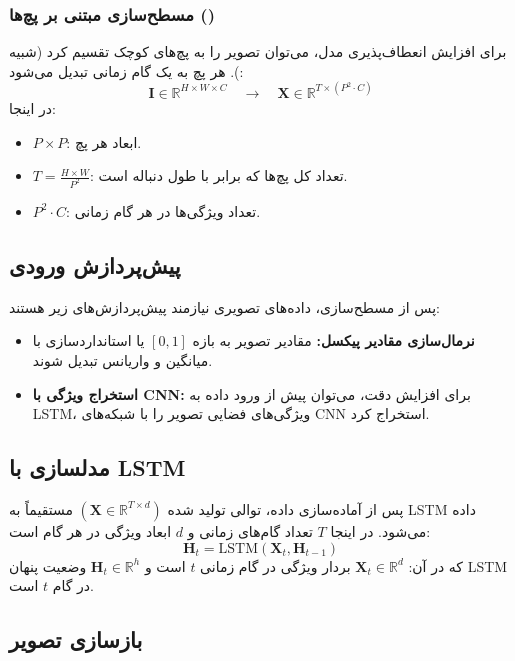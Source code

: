 \subsubsection{مسطح‌سازی مبتنی بر پچ‌ها ()}

برای افزایش انعطاف‌پذیری مدل، می‌توان تصویر را به پچ‌های کوچک تقسیم کرد (شبیه
\cite{dosovitskiyImageWorth16x162021}
). هر پچ به یک گام زمانی تبدیل می‌شود:
\[
\mathbf{I} \in \mathbb{R}^{H \times W \times C} \quad \rightarrow \quad \mathbf{X} \in \mathbb{R}^{T \times (P^2 \cdot C)}
\]
در اینجا:
\begin{itemize}
	\item \(P \times P\): ابعاد هر پچ.
	\item \(T = \frac{H \times W}{P^2}\): تعداد کل پچ‌ها که برابر با طول دنباله  است.
	\item \(P^2 \cdot C\): تعداد ویژگی‌ها در هر گام زمانی.
\end{itemize}

\subsection{پیش‌پردازش ورودی}

پس از مسطح‌سازی، داده‌های تصویری نیازمند پیش‌پردازش‌های زیر هستند:
\begin{itemize}
	\item \textbf{نرمال‌سازی مقادیر پیکسل:} مقادیر تصویر به بازه \([0, 1]\) یا استانداردسازی با میانگین و واریانس تبدیل شوند.
	\item \textbf{استخراج ویژگی با CNN:} برای افزایش دقت، می‌توان پیش از ورود داده به LSTM، ویژگی‌های فضایی تصویر را با شبکه‌های CNN استخراج کرد.
\end{itemize}

\subsection{مدلسازی با LSTM}

پس از آماده‌سازی داده، توالی تولید شده \((\mathbf{X} \in \mathbb{R}^{T \times d})\) مستقیماً به LSTM داده می‌شود. در اینجا \(T\) تعداد گام‌های زمانی و \(d\) ابعاد ویژگی در هر گام است:
$$
\mathbf{H}_t = \textrm{LSTM}(\mathbf{X}_t, \mathbf{H}_{t-1})
$$
که در آن:
\(\mathbf{X}_t \in \mathbb{R}^d\)
بردار ویژگی در گام زمانی $t$ است و
\(\mathbf{H}_t \in \mathbb{R}^h\)
وضعیت پنهان LSTM در گام $t$ است.

\subsection{بازسازی تصویر}

